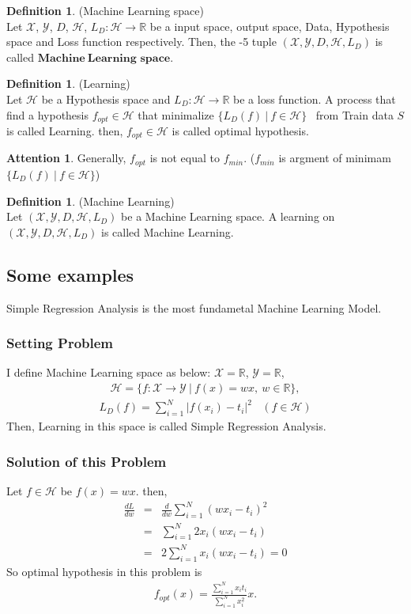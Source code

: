 \documentclass[11pt, a4paper, english, dvipdfmx]{jsarticle}
\theoremstyle{definition}
\newtheorem{Definition+}[Axiom+]{Definition}
\newtheorem{Attention+}[Axiom+]{Attention}
\newcommand{\R}{\mathbb{R}}
\newcommand{\X}{\mathcal{X}}
\newcommand{\Y}{\mathcal{Y}}
\newcommand{\Hil}{\mathcal{H}}
\newcommand{\MLsp}{(\X, \Y, D, \Hil, L_{D})}
\begin{document}
\begin{Definition+}(Machine Learning space)\\
    Let $\X$, $\Y$, $D$, $\Hil$, $L_{D}:\Hil\to\R$ be a input space, output space, Data, Hypothesis space and Loss function respectively.
    Then, the -5 tuple $\MLsp$ is called $\mathbf{Machine~Learning}$ $\mathbf{space}$.
\end{Definition+}
\begin{Definition+}(Learning)\\
   Let $\Hil$ be a Hypothesis space and $L_{D}:\Hil\to\R$ be a loss function. A process that find a hypothesis $f_{opt}\in\Hil$ that minimalize $\{L_{D}(f)~|~f\in\Hil\}$ ~from Train data $S$ is called Learning.
   then, $f_{opt}\in\Hil$ is called optimal hypothesis.
\end{Definition+}

\begin{Attention+}
    Generally, $f_{opt}$ is not equal to $f_{min}$. ($f_{min}$ is argment of minimam $\{L_{D}(f)~|~f\in\Hil\}$)
\end{Attention+}

\begin{Definition+}(Machine Learning)\\
    Let $\MLsp$ be a Machine Learning space. A learning on $\MLsp$ is called Machine Learning.
\end{Definition+}
\newpage
\subsection{Some examples}
Simple Regression Analysis is the most fundametal Machine Learning Model.
\subsubsection{Setting Problem}
I define Machine Learning space as below:
$\X = \R$, $\Y = \R$,
\begin{align*}
    \Hil = \{f:\X\to\Y~|~f(x) = wx,~ w\in\R\},
\end{align*}
\begin{align*}
    L_{D}(f) = \sum_{i = 1}^{N} |f(x_{i}) - t_{i}|^{2}~~~~(f\in\Hil)
\end{align*}
Then, Learning in this space is called Simple Regression Analysis.

\subsubsection{Solution of this Problem}
Let $f\in\Hil$ be $f(x) = wx$. then,
\begin{eqnarray*}
  \frac{dL}{dw} &=& \frac{d}{dw}\sum_{i = 1}^{N}(wx_{i} - t_{i})^{2}\\
                &=& \sum_{i = 1}^{N}2x_{i}(wx_{i} - t_{i})\\
                &=& 2\sum_{i = 1}^{N}x_{i}(wx_{i} - t_{i}) = 0
\end{eqnarray*}
So optimal hypothesis in this problem is
\begin{align*}
    f_{opt}(x) = \frac{\sum_{i = 1}^{N}x_{i}t_{i}}{\sum_{i = 1}^{N} x_{i}^{2}} x.
\end{align*}
\end{document}

